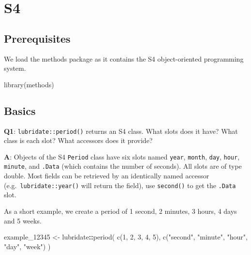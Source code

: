 \documentclass[
]{krantz}
\makeatletter
\newenvironment{Shaded}{\begin{snugshade}}{\end{snugshade}}
\newcommand{\DecValTok}[1]{\textcolor[rgb]{0.00,0.00,0.81}{#1}}
\newcommand{\KeywordTok}[1]{\textcolor[rgb]{0.13,0.29,0.53}{\textbf{#1}}}
\newcommand{\NormalTok}[1]{#1}
\newcommand{\OperatorTok}[1]{\textcolor[rgb]{0.81,0.36,0.00}{\textbf{#1}}}
\newcommand{\StringTok}[1]{\textcolor[rgb]{0.31,0.60,0.02}{#1}}
\newenvironment{kframe}{%
\medskip{}
\setlength{\fboxsep}{.8em}
 \def\at@end@of@kframe{}%
 \ifinner\ifhmode%
  \def\at@end@of@kframe{\end{minipage}}%
  \begin{minipage}{\columnwidth}%
 \fi\fi%
 \def\FrameCommand##1{\hskip\@totalleftmargin \hskip-\fboxsep
 \colorbox{shadecolor}{##1}\hskip-\fboxsep
     \hskip-\linewidth \hskip-\@totalleftmargin \hskip\columnwidth}%
 \MakeFramed {\advance\hsize-\width
   \@totalleftmargin\z@ \linewidth\hsize
   \@setminipage}}%
 {\par\unskip\endMakeFramed%
 \at@end@of@kframe}
\renewenvironment{Shaded}{\begin{kframe}}{\end{kframe}}
\renewcommand{\KeywordTok} [1]{\textcolor[rgb]{0.00,0.44,0.13}{{#1}}}
\renewcommand{\DecValTok}  [1]{\textcolor[rgb]{0.25,0.63,0.44}{{#1}}}
\renewcommand{\StringTok}  [1]{\textcolor[rgb]{0.25,0.44,0.63}{{#1}}}
\renewcommand{\NormalTok}  [1]{{#1}}
\makeatother
\begin{document}
\hypertarget{s4}{%
\chapter{S4}\label{s4}}

\hypertarget{prerequisites-8}{%
\section*{Prerequisites}\label{prerequisites-8}}


We load the methods package as it contains the S4 object-oriented programming system.

\begin{Shaded}
\begin{Highlighting}[]
\KeywordTok{library}\NormalTok{(methods)}
\end{Highlighting}
\end{Shaded}


\hypertarget{basics-1}{%
\section{Basics}\label{basics-1}}

\textbf{{Q1}}: \texttt{lubridate::period()} returns an S4 class. What slots does it have? What class is each slot? What accessors does it provide?

\textbf{{A}}: Objects of the S4 \texttt{Period} class have six slots named \texttt{year}, \texttt{month}, \texttt{day}, \texttt{hour}, \texttt{minute}, and \texttt{.Data} (which contains the number of seconds). All slots are of type double. Most fields can be retrieved by an identically named accessor (e.g.~\texttt{lubridate::year()} will return the field), use \texttt{second()} to get the \texttt{.Data} slot.

As a short example, we create a period of 1 second, 2 minutes, 3 hours, 4 days and 5 weeks.

\begin{Shaded}
\begin{Highlighting}[]
\NormalTok{example_}\DecValTok{12345}\NormalTok{ <-}\StringTok{ }\NormalTok{lubridate}\OperatorTok{::}\KeywordTok{period}\NormalTok{(}
  \KeywordTok{c}\NormalTok{(}\DecValTok{1}\NormalTok{, }\DecValTok{2}\NormalTok{, }\DecValTok{3}\NormalTok{, }\DecValTok{4}\NormalTok{, }\DecValTok{5}\NormalTok{), }
  \KeywordTok{c}\NormalTok{(}\StringTok{"second"}\NormalTok{, }\StringTok{"minute"}\NormalTok{, }\StringTok{"hour"}\NormalTok{, }\StringTok{"day"}\NormalTok{, }\StringTok{"week"}\NormalTok{)}
\NormalTok{)}
\end{Highlighting}
\end{Shaded}
\end{document}
